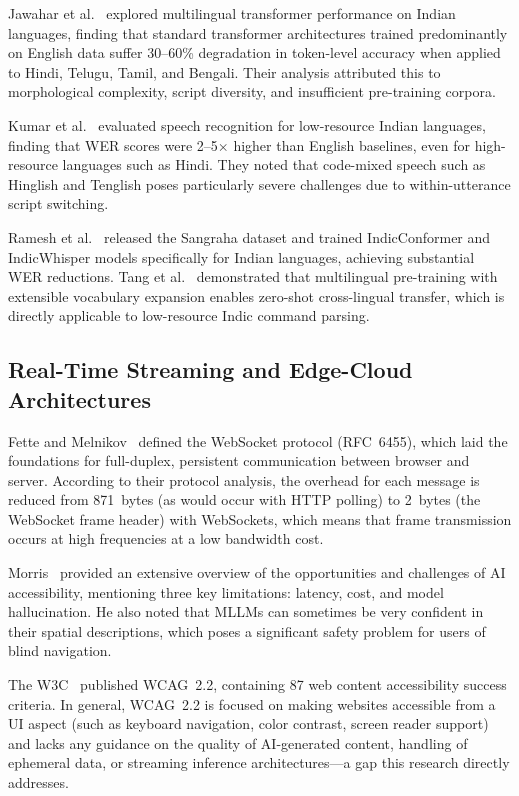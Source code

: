 \documentclass[pdflatex,sn-mathphys-num]{sn-jnl}
\theoremstyle{thmstyleone}%
\theoremstyle{thmstyletwo}%
\theoremstyle{thmstylethree}%
\begin{document}
Jawahar et al.~\cite{jawahar2021indicnlp} explored multilingual transformer performance
on Indian languages, finding that standard transformer architectures trained predominantly
on English data suffer 30--60\% degradation in token-level accuracy when applied to
Hindi, Telugu, Tamil, and Bengali. Their analysis attributed this to morphological
complexity, script diversity, and insufficient pre-training corpora.

Kumar et al.~\cite{kumar2022indic} evaluated speech recognition for low-resource Indian
languages, finding that WER scores were 2--5$\times$ higher than English baselines, even
for high-resource languages such as Hindi. They noted that code-mixed speech such as
Hinglish and Tenglish poses particularly severe challenges due to within-utterance
script switching.

Ramesh et al.~\cite{indic2023ai4bharat} released the Sangraha dataset and trained
IndicConformer and IndicWhisper models specifically for Indian languages, achieving
substantial WER reductions. Tang et al.~\cite{tang2021multilingual} demonstrated that
multilingual pre-training with extensible vocabulary expansion enables zero-shot
cross-lingual transfer, which is directly applicable to low-resource Indic command parsing.

\subsection{Real-Time Streaming and Edge-Cloud Architectures}
Fette and Melnikov~\cite{fette2011websocket} defined the WebSocket protocol (RFC~6455),
which laid the foundations for full-duplex, persistent communication between browser and server.
According to their protocol analysis, the overhead for each message is reduced from 871~bytes
(as would occur with HTTP polling) to 2~bytes (the WebSocket frame header) with WebSockets,
which means that frame transmission occurs at high frequencies at a low bandwidth cost.

Morris~\cite{morris2020ai} provided an extensive overview of the opportunities and challenges
of AI accessibility, mentioning three key limitations: latency, cost, and model hallucination.
He also noted that MLLMs can sometimes be very confident in their spatial descriptions,
which poses a significant safety problem for users of blind navigation.

The W3C~\cite{w3c2023wcag} published WCAG~2.2, containing 87 web content accessibility
success criteria. In general, WCAG~2.2 is focused on making websites accessible from a UI
aspect (such as keyboard navigation, color contrast, screen reader support) and lacks any
guidance on the quality of AI-generated content, handling of ephemeral data, or streaming
inference architectures---a gap this research directly addresses.
\end{document}

